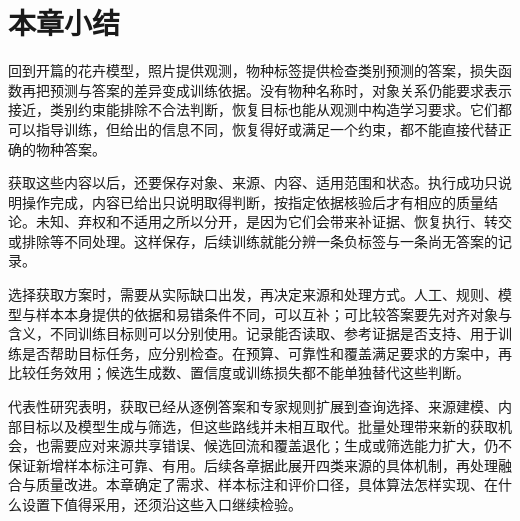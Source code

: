 \FloatBarrier
\section{本章小结}
\label{sec:knowledge-acquisition-summary}

回到开篇的花卉模型，照片提供观测，物种标签提供检查类别预测的答案，损失函数再把预测与答案的差异变成训练依据。没有物种名称时，对象关系仍能要求表示接近，类别约束能排除不合法判断，恢复目标也能从观测中构造学习要求。它们都可以指导训练，但给出的信息不同，恢复得好或满足一个约束，都不能直接代替正确的物种答案。

获取这些内容以后，还要保存对象、来源、内容、适用范围和状态。执行成功只说明操作完成，内容已给出只说明取得判断，按指定依据核验后才有相应的质量结论。未知、弃权和不适用之所以分开，是因为它们会带来补证据、恢复执行、转交或排除等不同处理。这样保存，后续训练就能分辨一条负标签与一条尚无答案的记录。

选择获取方案时，需要从实际缺口出发，再决定来源和处理方式。人工、规则、模型与样本本身提供的依据和易错条件不同，可以互补；可比较答案要先对齐对象与含义，不同训练目标则可以分别使用。记录能否读取、参考证据是否支持、用于训练是否帮助目标任务，应分别检查。在预算、可靠性和覆盖满足要求的方案中，再比较任务效用；候选生成数、置信度或训练损失都不能单独替代这些判断。

代表性研究表明，获取已经从逐例答案和专家规则扩展到查询选择、来源建模、内部目标以及模型生成与筛选，但这些路线并未相互取代。批量处理带来新的获取机会，也需要应对来源共享错误、候选回流和覆盖退化；生成或筛选能力扩大，仍不保证新增样本标注可靠、有用。后续各章据此展开四类来源的具体机制，再处理融合与质量改进。本章确定了需求、样本标注和评价口径，具体算法怎样实现、在什么设置下值得采用，还须沿这些入口继续检验。
